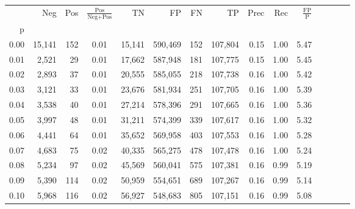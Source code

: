 \begin{tabular}{rrrcrrrrrrrrrrr}
\toprule
{} &     Neg &    Pos & $\frac{\text{Pos}}{\text{Neg}+\text{Pos}}$ &       TN &       FP &       FN &       TP &  Prec &   Rec & $\frac{\text{FP}}{\text{P}}$ \\
p    &         &        &                                            &          &          &          &          &       &       &                              \\
\midrule
0.00 &  15,141 &    152 &                                       0.01 &   15,141 &  590,469 &      152 &  107,804 &  0.15 &  1.00 &                         5.47 \\
0.01 &   2,521 &     29 &                                       0.01 &   17,662 &  587,948 &      181 &  107,775 &  0.15 &  1.00 &                         5.45 \\
0.02 &   2,893 &     37 &                                       0.01 &   20,555 &  585,055 &      218 &  107,738 &  0.16 &  1.00 &                         5.42 \\
0.03 &   3,121 &     33 &                                       0.01 &   23,676 &  581,934 &      251 &  107,705 &  0.16 &  1.00 &                         5.39 \\
0.04 &   3,538 &     40 &                                       0.01 &   27,214 &  578,396 &      291 &  107,665 &  0.16 &  1.00 &                         5.36 \\
0.05 &   3,997 &     48 &                                       0.01 &   31,211 &  574,399 &      339 &  107,617 &  0.16 &  1.00 &                         5.32 \\
0.06 &   4,441 &     64 &                                       0.01 &   35,652 &  569,958 &      403 &  107,553 &  0.16 &  1.00 &                         5.28 \\
0.07 &   4,683 &     75 &                                       0.02 &   40,335 &  565,275 &      478 &  107,478 &  0.16 &  1.00 &                         5.24 \\
0.08 &   5,234 &     97 &                                       0.02 &   45,569 &  560,041 &      575 &  107,381 &  0.16 &  0.99 &                         5.19 \\
0.09 &   5,390 &    114 &                                       0.02 &   50,959 &  554,651 &      689 &  107,267 &  0.16 &  0.99 &                         5.14 \\
0.10 &   5,968 &    116 &                                       0.02 &   56,927 &  548,683 &      805 &  107,151 &  0.16 &  0.99 &                         5.08 \\

\end{tabular}
